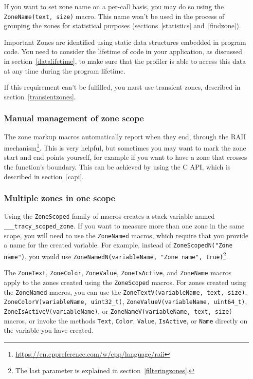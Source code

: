 \documentclass[hidelinks,titlepage,a4paper]{article}
\begin{document}
If you want to set zone name on a per-call basis, you may do so using the \texttt{ZoneName(text, size)} macro. This name won't be used in the process of grouping the zones for statistical purposes (sections~\ref{statistics} and~\ref{findzone}).

\begin{bclogo}[
noborder=true,
couleur=black!5,
logo=\bcbombe
]{Important}
Zones are identified using static data structures embedded in program code. You need to consider the lifetime of code in your application, as discussed in section~\ref{datalifetime}, to make sure that the profiler is able to access this data at any time during the program lifetime.

If this requirement can't be fulfilled, you must use transient zones, described in section~\ref{transientzones}.
\end{bclogo}

\subsubsection{Manual management of zone scope}

The zone markup macros automatically report when they end, through the RAII mechanism\footnote{\url{https://en.cppreference.com/w/cpp/language/raii}}. This is very helpful, but sometimes you may want to mark the zone start and end points yourself, for example if you want to have a zone that crosses the function's boundary. This can be achieved by using the C API, which is described in section~\ref{capi}.

\subsubsection{Multiple zones in one scope}
\label{multizone}

Using the \texttt{ZoneScoped} family of macros creates a stack variable named \texttt{\_\_\_tracy\_scoped\_zone}. If you want to measure more than one zone in the same scope, you will need to use the \texttt{ZoneNamed} macros, which require that you provide a name for the created variable. For example, instead of \texttt{ZoneScopedN("Zone name")}, you would use \texttt{ZoneNamedN(variableName, "Zone name", true)}\footnote{The last parameter is explained in section~\ref{filteringzones}.}.

The \texttt{ZoneText}, \texttt{ZoneColor}, \texttt{ZoneValue}, \texttt{ZoneIsActive}, and \texttt{ZoneName} macros apply to the zones created using the \texttt{ZoneScoped} macros. For zones created using the \texttt{ZoneNamed} macros, you can use the \texttt{ZoneTextV(variableName, text, size)}, \texttt{ZoneColorV(variableName, uint32\_t)}, \texttt{ZoneValueV(variableName, uint64\_t)}, \texttt{ZoneIsActiveV(variableName)}, or \texttt{ZoneNameV(variableName, text, size)} macros, or invoke the methods \texttt{Text}, \texttt{Color}, \texttt{Value}, \texttt{IsActive}, or \texttt{Name} directly on the variable you have created.
\end{document}
